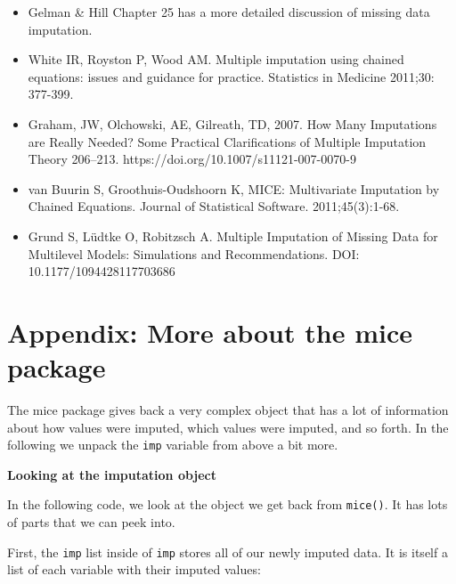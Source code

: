 \documentclass[
  letterpaper,
  DIV=11,
  numbers=noendperiod]{scrreprt}
\newenvironment{Shaded}{}{}
\newcommand{\NormalTok}[1]{#1}
\newcommand{\SpecialCharTok}[1]{\textcolor[rgb]{0.25,0.44,0.63}{#1}}
\begin{document}
\begin{itemize}
\item
  Gelman \& Hill Chapter 25 has a more detailed discussion of missing
  data imputation.
\item
  White IR, Royston P, Wood AM. Multiple imputation using chained
  equations: issues and guidance for practice. Statistics in Medicine
  2011;30: 377-399.
\item
  Graham, JW, Olchowski, AE, Gilreath, TD, 2007. How Many Imputations
  are Really Needed? Some Practical Clarifications of Multiple
  Imputation Theory 206--213. https://doi.org/10.1007/s11121-007-0070-9
\item
  van Buurin S, Groothuis-Oudshoorn K, MICE: Multivariate Imputation by
  Chained Equations. Journal of Statistical Software. 2011;45(3):1-68.
\item
  Grund S, Lüdtke O, Robitzsch A. Multiple Imputation of Missing Data
  for Multilevel Models: Simulations and Recommendations. DOI:
  10.1177/1094428117703686
\end{itemize}

\section{Appendix: More about the mice
package}\label{appendix-more-about-the-mice-package}

The mice package gives back a very complex object that has a lot of
information about how values were imputed, which values were imputed,
and so forth. In the following we unpack the \texttt{imp} variable from
above a bit more.

\textbf{Looking at the imputation object}

In the following code, we look at the object we get back from
\texttt{mice()}. It has lots of parts that we can peek into.

First, the \texttt{imp} list inside of \texttt{imp} stores all of our
newly imputed data. It is itself a list of each variable with their
imputed values:

\begin{Shaded}
\end{Shaded}
\end{document}
